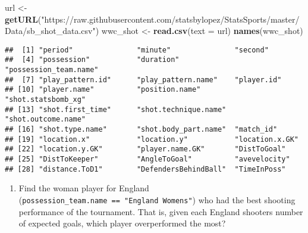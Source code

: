 \documentclass[]{article}
\newenvironment{Shaded}{\begin{snugshade}}{\end{snugshade}}
\newcommand{\DataTypeTok}[1]{\textcolor[rgb]{0.13,0.29,0.53}{#1}}
\newcommand{\KeywordTok}[1]{\textcolor[rgb]{0.13,0.29,0.53}{\textbf{#1}}}
\newcommand{\NormalTok}[1]{#1}
\newcommand{\StringTok}[1]{\textcolor[rgb]{0.31,0.60,0.02}{#1}}
\providecommand{\tightlist}{%
  \setlength{\itemsep}{0pt}\setlength{\parskip}{0pt}}
\begin{document}
\begin{Shaded}
\begin{Highlighting}[]
\NormalTok{url <-}\StringTok{ }\KeywordTok{getURL}\NormalTok{(}\StringTok{"https://raw.githubusercontent.com/statsbylopez/StatsSports/master/Data/sb_shot_data.csv"}\NormalTok{)}
\NormalTok{wwc_shot <-}\StringTok{ }\KeywordTok{read.csv}\NormalTok{(}\DataTypeTok{text =}\NormalTok{ url)}
\KeywordTok{names}\NormalTok{(wwc_shot)}
\end{Highlighting}
\end{Shaded}

\begin{verbatim}
##  [1] "period"               "minute"               "second"              
##  [4] "possession"           "duration"             "possession_team.name"
##  [7] "play_pattern.id"      "play_pattern.name"    "player.id"           
## [10] "player.name"          "position.name"        "shot.statsbomb_xg"   
## [13] "shot.first_time"      "shot.technique.name"  "shot.outcome.name"   
## [16] "shot.type.name"       "shot.body_part.name"  "match_id"            
## [19] "location.x"           "location.y"           "location.x.GK"       
## [22] "location.y.GK"        "player.name.GK"       "DistToGoal"          
## [25] "DistToKeeper"         "AngleToGoal"          "avevelocity"         
## [28] "distance.ToD1"        "DefendersBehindBall"  "TimeInPoss"
\end{verbatim}

\begin{enumerate}
\def\labelenumi{\arabic{enumi}.}
\tightlist
\item
  Find the woman player for England
  (\texttt{possession\_team.name\ ==\ "England\ Women\textquotesingle{}s"})
  who had the best shooting performance of the tournament. That is,
  given each England shooters number of expected goals, which player
  overperformed the most?
\end{enumerate}
\end{document}
